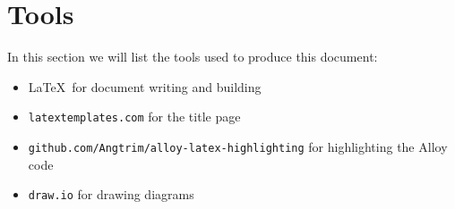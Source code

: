 \documentclass[12pt]{article}
\begin{document}

\clearpage

\nonumber

\tableofcontents
\clearpage

\pagestyle{fancy}
\fancyhead[LE,RO]{\slshape \rightmark}
\fancyhead[LO,RE]{\slshape \leftmark}
\renewcommand{\footrulewidth}{0.3pt}
\cfoot{}


\clearpage


\clearpage


\clearpage


\clearpage


\clearpage


\clearpage


\clearpage

\section*{Tools}

  In this section we will list the tools used to produce this document:
  \begin{itemize}
    \item \LaTeX\ for document writing and building
    \item \texttt{latextemplates.com} for the title page
    \item \texttt{github.com/Angtrim/alloy-latex-highlighting} for highlighting the Alloy code
    \item \texttt{draw.io} for drawing diagrams
  \end{itemize}


\end{document}
